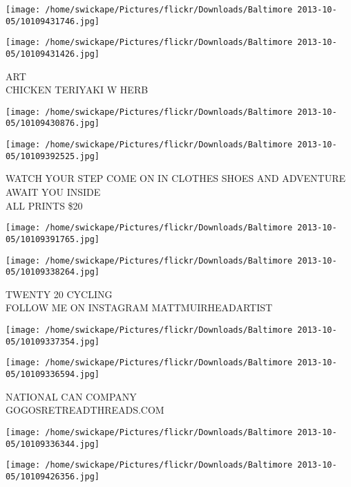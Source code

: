 \documentclass[10pt,letterpaper]{article}
\begin{document}
\texttt{[image: /home/swickape/Pictures/flickr/Downloads/Baltimore 2013-10-05/10109431746.jpg]}

\vspace{0.25in}
\texttt{[image: /home/swickape/Pictures/flickr/Downloads/Baltimore 2013-10-05/10109431426.jpg]}

ART\\
CHICKEN TERIYAKI W HERB\\
\pagebreak

\texttt{[image: /home/swickape/Pictures/flickr/Downloads/Baltimore 2013-10-05/10109430876.jpg]}

\vspace{0.25in}
\texttt{[image: /home/swickape/Pictures/flickr/Downloads/Baltimore 2013-10-05/10109392525.jpg]}

WATCH YOUR STEP COME ON IN CLOTHES SHOES AND ADVENTURE AWAIT YOU INSIDE\\
ALL PRINTS \$20\\
\pagebreak

\texttt{[image: /home/swickape/Pictures/flickr/Downloads/Baltimore 2013-10-05/10109391765.jpg]}

\vspace{0.25in}
\texttt{[image: /home/swickape/Pictures/flickr/Downloads/Baltimore 2013-10-05/10109338264.jpg]}

TWENTY 20 CYCLING\\
FOLLOW ME ON INSTAGRAM MATTMUIRHEADARTIST\\
\pagebreak

\texttt{[image: /home/swickape/Pictures/flickr/Downloads/Baltimore 2013-10-05/10109337354.jpg]}

\vspace{0.25in}
\texttt{[image: /home/swickape/Pictures/flickr/Downloads/Baltimore 2013-10-05/10109336594.jpg]}

NATIONAL CAN COMPANY\\
GOGOSRETREADTHREADS.COM\\
\pagebreak

\texttt{[image: /home/swickape/Pictures/flickr/Downloads/Baltimore 2013-10-05/10109336344.jpg]}

\vspace{0.25in}
\texttt{[image: /home/swickape/Pictures/flickr/Downloads/Baltimore 2013-10-05/10109426356.jpg]}
\end{document}
